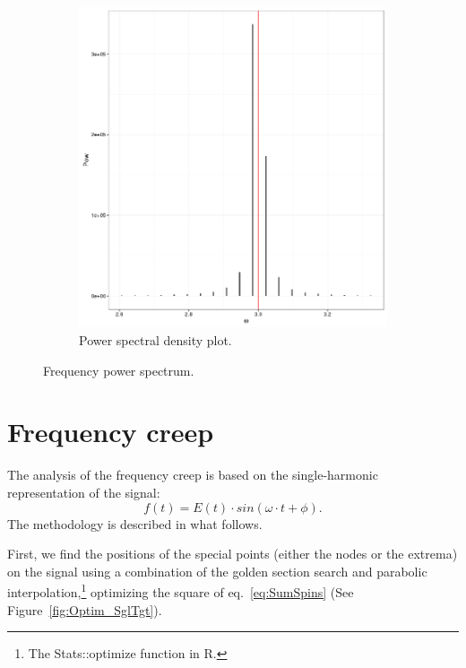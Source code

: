 \documentclass{article}
\begin{document}
\begin{figure}[h]
\begin{subfigure}{.5\textwidth}
		\includegraphics[scale=.5]{img/Signal/NORM_Spectrum}
		\caption{Power spectral density plot.\label{fig:PSD_cDyNorm}}
	\end{subfigure}
	\caption{Frequency power spectrum.}
\end{figure}

\section{Frequency creep}
The analysis of the frequency creep is based on the single-harmonic representation of the signal:
\begin{equation}\label{eq:OneHarmonic}
	f(t) = E(t)\cdot sin(\omega\cdot t + \phi).
\end{equation}
The methodology is described in what follows.

First, we find the positions of the special points (either the nodes or the extrema) on the signal using a combination of the golden section search and parabolic interpolation,\footnote{The Stats::optimize function in R.} optimizing the square of eq.~\eqref{eq:SumSpins} (See Figure~\ref{fig:Optim_SglTgt}).
\end{document}
